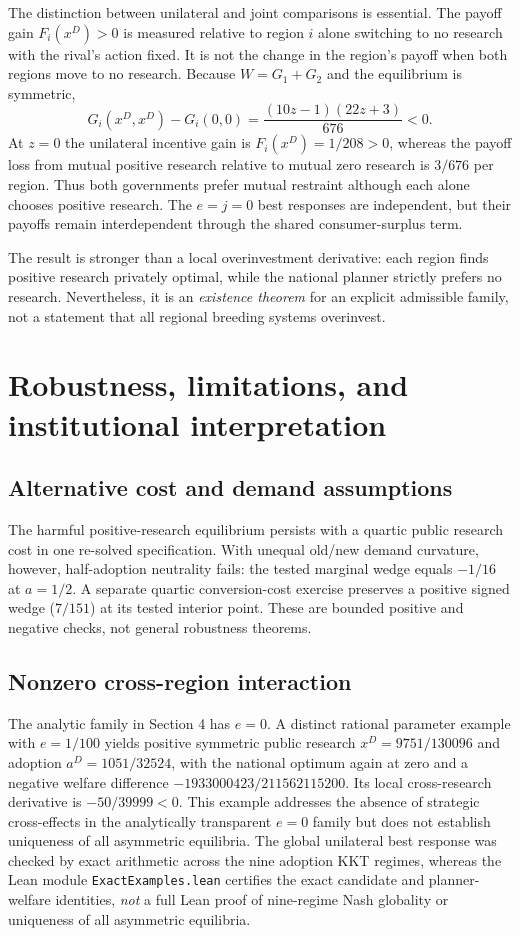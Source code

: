 \documentclass[11pt,a4paper]{article}
\begin{document}
The distinction between unilateral and joint comparisons is essential. The payoff gain $F_i(x^D)>0$ is measured relative to region $i$ alone switching to no research with the rival's action fixed. It is not the change in the region's payoff when both regions move to no research. Because $W=G_1+G_2$ and the equilibrium is symmetric,
\begin{equation}
G_i(x^D,x^D)-G_i(0,0)=\frac{(10z-1)(22z+3)}{676}<0.
\label{eq:mutuallocal}
\end{equation}
At $z=0$ the unilateral incentive gain is $F_i(x^D)=1/208>0$, whereas the payoff loss from mutual positive research relative to mutual zero research is $3/676$ per region. Thus both governments prefer mutual restraint although each alone chooses positive research. The $e=j=0$ best responses are independent, but their payoffs remain interdependent through the shared consumer-surplus term.

The result is stronger than a local overinvestment derivative: each region finds positive research privately optimal, while the national planner strictly prefers no research. Nevertheless, it is an \emph{existence theorem} for an explicit admissible family, not a statement that all regional breeding systems overinvest.

\section{Robustness, limitations, and institutional interpretation}
\subsection{Alternative cost and demand assumptions}
The harmful positive-research equilibrium persists with a quartic public research cost in one re-solved specification. With unequal old/new demand curvature, however, half-adoption neutrality fails: the tested marginal wedge equals $-1/16$ at $a=1/2$. A separate quartic conversion-cost exercise preserves a positive signed wedge ($7/151$) at its tested interior point. These are bounded positive and negative checks, not general robustness theorems.

\subsection{Nonzero cross-region interaction}
The analytic family in Section 4 has $e=0$. A distinct rational parameter example with $e=1/100$ yields positive symmetric public research $x^D=9751/130096$ and adoption $a^D=1051/32524$, with the national optimum again at zero and a negative welfare difference $-1933000423/211562115200$. Its local cross-research derivative is $-50/39999<0$. This example addresses the absence of strategic cross-effects in the analytically transparent $e=0$ family but does not establish uniqueness of all asymmetric equilibria. The global unilateral best response was checked by exact arithmetic across the nine adoption KKT regimes, whereas the Lean module \texttt{ExactExamples.lean} certifies the exact candidate and planner-welfare identities, \emph{not} a full Lean proof of nine-regime Nash globality or uniqueness of all asymmetric equilibria.
\end{document}
